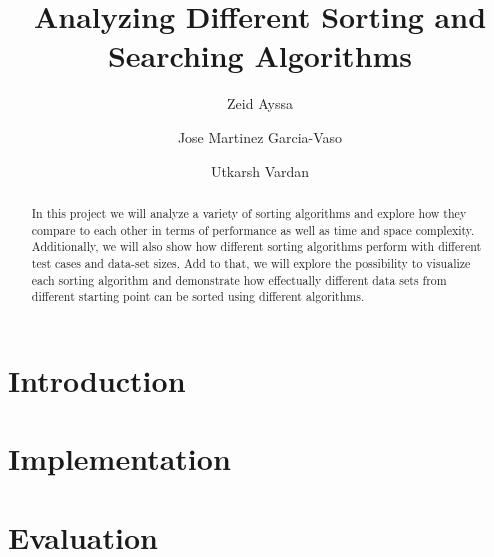 \documentclass[sigconf,table]{acmart}
\begin{document}
\title{Analyzing Different Sorting and Searching Algorithms}

\author{Zeid Ayssa}

\author{Jose Martinez Garcia-Vaso}

\author{Utkarsh Vardan}

\begin{abstract}
In this project we will analyze a variety of sorting algorithms and explore how they compare to each other in terms of performance as well as time and space complexity. Additionally, we will also show how different sorting algorithms perform with different test cases and data-set sizes. Add to that, we will explore the possibility to visualize each sorting algorithm and demonstrate how effectually different data sets from different starting point can be sorted using different algorithms.

\end{abstract}

\maketitle

\section{Introduction}



\section{Implementation}


\section{Evaluation}


\begin{comment}
\section{Future Work}


\section{Conclusion}


\end{comment}



\end{document}
